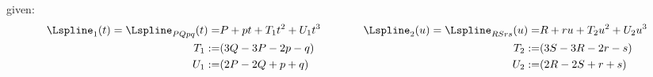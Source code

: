 given:
$$\begin{aligned}
	\Lspline_1(t) = \Lspline_{PQpq}(t) =& P + pt + T_1t^2 + U_1t^3 & \hspace{1cm}
	\Lspline_2(u) = \Lspline_{RSrs}(u) =& R + ru + T_2u^2 + U_2u^3 \\
	T_1 :=& (3Q-3P-2p-q) & \hspace{1cm}
	T_2 :=& (3S-3R-2r-s) \\
	U_1 :=& (2P-2Q+p+q)  & \hspace{1cm}
	U_2 :=& (2R-2S+r+s) \\
\end{aligned}$$

